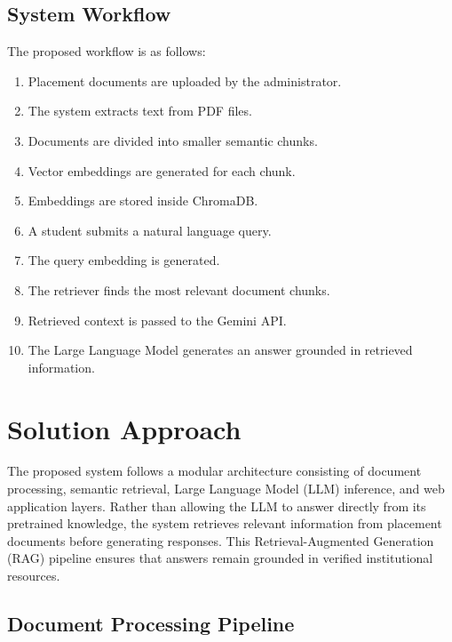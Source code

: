 \documentclass[11pt]{article}
\begin{document}
\subsection{System Workflow}

The proposed workflow is as follows:

\begin{enumerate}

\item Placement documents are uploaded by the administrator.

\item The system extracts text from PDF files.

\item Documents are divided into smaller semantic chunks.

\item Vector embeddings are generated for each chunk.

\item Embeddings are stored inside ChromaDB.

\item A student submits a natural language query.

\item The query embedding is generated.

\item The retriever finds the most relevant document chunks.

\item Retrieved context is passed to the Gemini API.

\item The Large Language Model generates an answer grounded in retrieved information.

\end{enumerate}
\section{Solution Approach}

The proposed system follows a modular architecture consisting of document processing, semantic retrieval, Large Language Model (LLM) inference, and web application layers. Rather than allowing the LLM to answer directly from its pretrained knowledge, the system retrieves relevant information from placement documents before generating responses. This Retrieval-Augmented Generation (RAG) pipeline ensures that answers remain grounded in verified institutional resources.

\subsection{Document Processing Pipeline}
\end{document}

